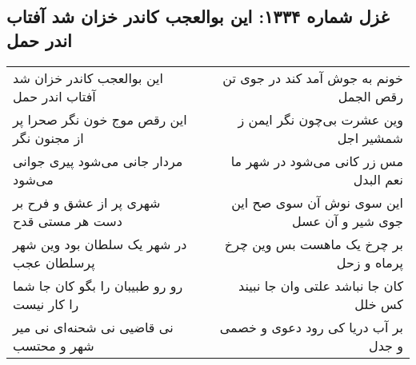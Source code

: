 \begin{center}
\section*{غزل شماره ۱۳۳۴: این بوالعجب کاندر خزان شد آفتاب اندر حمل}
\label{sec:1334}
\begin{longtable}{l p{0.5cm} r}
این بوالعجب کاندر خزان شد آفتاب اندر حمل
&&
خونم به جوش آمد کند در جوی تن رقص الجمل
\\
این رقص موج خون نگر صحرا پر از مجنون نگر
&&
وین عشرت بی‌چون نگر ایمن ز شمشیر اجل
\\
مردار جانی می‌شود پیری جوانی می‌شود
&&
مس زر کانی می‌شود در شهر ما نعم البدل
\\
شهری پر از عشق و فرح بر دست هر مستی قدح
&&
این سوی نوش آن سوی صح این جوی شیر و آن عسل
\\
در شهر یک سلطان بود وین شهر پرسلطان عجب
&&
بر چرخ یک ماهست بس وین چرخ پرماه و زحل
\\
رو رو طبیبان را بگو کان جا شما را کار نیست
&&
کان جا نباشد علتی وان جا نبیند کس خلل
\\
نی قاضیی نی شحنه‌ای نی میر شهر و محتسب
&&
بر آب دریا کی رود دعوی و خصمی و جدل
\\
\end{longtable}
\end{center}
